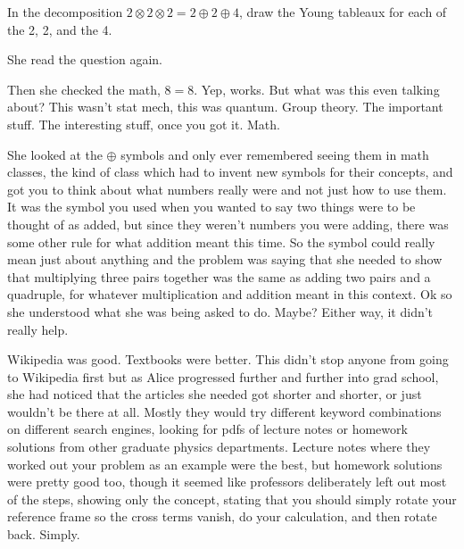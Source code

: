 \mypause

 {\ttfamily In the decomposition $2 \otimes 2 \otimes 2 = 2 \oplus 2 \oplus 4$, draw the Young tableaux for each of the 2, 2, and the 4. }


\mypause 

She read the question again. 

\mypause
%

Then she checked the math, $8=8$. Yep, works. But what was this even talking about? This wasn't stat mech, this was quantum. Group theory. The important stuff. The interesting stuff, once you got it. Math. 

She looked at the $\oplus$ symbols and only ever remembered seeing them in math classes, the kind of class which had to invent new symbols for their concepts, and got you to think about what numbers really were and not just how to use them. It was the symbol you used when you wanted to say two things were to be thought of as added, but since they weren't numbers you were adding, there was some other rule for what addition meant this time. So the symbol could really mean just about anything and the problem was saying that she needed to show that multiplying three pairs together was the same as adding two pairs and a quadruple, for whatever multiplication and addition meant in this context. Ok so she understood what she was being asked to do. Maybe? Either way, it didn't really help.

Wikipedia was good. Textbooks were better. This didn't stop anyone from going to Wikipedia first but as Alice progressed further and further into grad school, she had noticed that the articles she needed got shorter and shorter, or just wouldn't be there at all. Mostly they would try different keyword combinations on different search engines, looking for pdfs of lecture notes or homework solutions from other graduate physics departments. Lecture notes where they worked out your problem as an example were the best, but homework solutions were pretty good too, though it seemed like professors deliberately left out most of the steps, showing only the concept, stating that you should simply rotate your reference frame so the cross terms vanish, do your calculation, and then rotate back. Simply.

